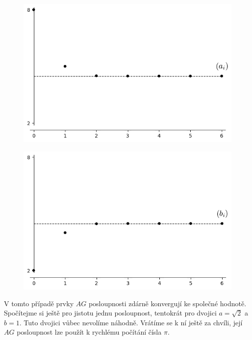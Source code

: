 \documentclass[12pt]{report}
\begin{document}
\begin{priklad}
\begin{figure}[h]
\centering
\begin{minipage}{.5\textwidth}
  \centering
  \includegraphics[width=.9\linewidth]{Ai2.png}
  \label{složka $(a_i)$}
\end{minipage}%
\begin{minipage}{.5\textwidth}
  \centering
  \includegraphics[width=.9\linewidth]{Bi2.png}
  \label{složka $(b_i)$}
\end{minipage}
\end{figure}
V tomto případě prvky $AG$ posloupnosti zdárně konvergují ke společné hodnotě. Spočítejme si ještě pro jistotu jednu posloupnost, tentokrát pro dvojici $a=\sqrt{2}$ a $b=1$. Tuto dvojici vůbec nevolíme náhodně. Vrátíme se k ní ještě za chvíli, její $AG$ posloupnost lze použít k rychlému počítání čísla $\pi$.


\end{priklad}
\end{document}
